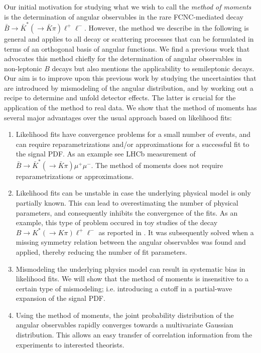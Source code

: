 \documentclass[aps,nofootinbib,preprintnumbers,prd,twocolumn]{revtex4-1}
\begin{document}
Our initial motivation for studying what we wish to call the
\emph{method of moments} is the determination of angular observables
in the rare FCNC-mediated decay $\bar{B}\to \bar{K}^*(\to
\bar{K}\pi)\ell^+\ell^-$. However, the method we describe in the
following is general and applies to all decay or scattering
processes that can be formulated in terms of an orthogonal basis of angular functions.
We find a previous work \cite{Dighe:1998vk} that
advocates this method chiefly for the determination of angular
observables in non-leptonic $B$ decays but also mentions the
applicability to semileptonic decays. Our aim is to improve upon this
previous work by studying the uncertainties that are introduced by
mismodeling of the angular distribution, and by working out a recipe
to determine and unfold detector effects. The latter is crucial for
the application of the method to real data. We show that
the method of moments has several major advantages over the usual approach
based on likelihood fits:
\begin{enumerate}
    \item Likelihood fits have convergence problems for a small number of
        events, and can require reparametrizations and/or approximations
        for a successful fit to the signal PDF. As an example see LHCb measurement of $\bar{B}\to \bar{K}^*(\to \bar{K}\pi)\mu^+\mu^-$\cite{Aaij:2013qta}. The method of moments does not require reparametrizations or approximations.

    \item Likelihood fits  can be unstable in case the underlying
        physical model is only partially known. This can lead to
        overestimating the number of physical parameters, and consequently
        inhibits the convergence of the fits. As an example, this type
        of problem occured in toy studies of the decay $B\to K^*(\to K\pi)\ell^+\ell^-$
        as reported in \cite{Egede:1142152}. It was subsequently solved
        when a missing symmetry relation between the angular observables
        was found and applied, thereby reducing the number of fit parameters.
    \item Mismodeling the underlying physics model can result in systematic bias
        in likelihood fits. We will
        show that the method of moments is insensitive to a certain type of mismodeling;
        i.e. introducing a cutoff in a partial-wave expansion of the signal PDF.

    \item Using the method of moments, the joint probability distribution of the
        angular observables rapidly converges towards a multivariate Gaussian distribution.
        This allows an easy transfer of correlation information from the experiments to
        interested theorists.
\end{enumerate}
\end{document}
